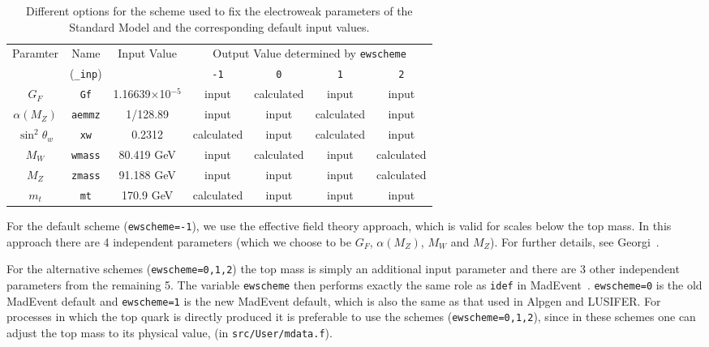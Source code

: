 \documentclass[12pt]{article}
\begin{document}
\begin{table}
\begin{center}
\begin{tabular}{|c|c|c|c|c|c|c|} \hline
 Paramter & Name & Input Value
 & \multicolumn{4}{c|}{Output Value determined by \tt ewscheme} \\
\cline{4-7}
& ({\tt \_inp}) & & {\tt -1} & {\tt 0} & {\tt 1} & {\tt 2} \\ \hline
$G_F$            & {\tt Gf}      & 1.16639$\times$10$^{-5}$ 
 & input & calculated & input & input \\
$\alpha(M_Z)$    & {\tt aemmz}   & 1/128.89                 
 & input & input & calculated & input \\
$\sin^2 \theta_w$& {\tt xw}      & 0.2312               
 & calculated & input & calculated & input \\
$M_W$            & {\tt wmass}   & 80.419 GeV                
 & input & calculated & input & calculated \\
$M_Z$            & {\tt zmass}   & 91.188 GeV               
 & input & input & input & calculated \\
$m_t$            & {\tt mt}      & 170.9 GeV                  
 & calculated & input & input & input \\
\hline
\end{tabular}
\caption{Different options for the scheme used to fix the electroweak
parameters of the Standard Model and the corresponding default input
values.}
\label{ewscheme}
\end{center}
\end{table}

For the default scheme ({\tt ewscheme=-1}), we use the effective field
theory approach, which is valid for scales below the top mass. In this
approach there are 4 independent parameters (which we choose to be
$G_F$, $\alpha(M_Z)$, $M_W$ and $M_Z$). For further details,
see Georgi~\cite{Georgi:1991ci}.

For the alternative schemes ({\tt ewscheme=0,1,2}) the top mass is simply
an additional input parameter and there are 3 other independent
parameters from the remaining 5. The variable {\tt ewscheme} then performs
exactly the same role as {\tt idef} in MadEvent~\cite{Maltoni:2002qb}.
{\tt ewscheme=0} is the old MadEvent default and {\tt ewscheme=1} is the
new MadEvent default, which is also the same as that used in Alpgen and
LUSIFER. For processes in which the top quark is directly produced  it is 
preferable to use  the schemes ({\tt ewscheme=0,1,2}), since in these schemes
one can adjust the top mass to its physical value, (in {\tt src/User/mdata.f}).
\end{document}
